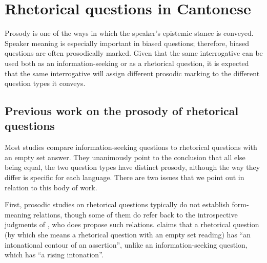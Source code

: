 \documentclass[output=paper,colorlinks,citecolor=brown            ,chinesefont]{langscibook}
\begin{document}
\section{Rhetorical questions in Cantonese}
\label{sec:Cantonese}
\largerpage
Prosody is one of the ways in which the speaker's epistemic stance is conveyed. Speaker meaning is especially important in biased questions; therefore, biased questions are often prosodically marked. Given that the same interrogative can be used both as an information-seeking or as a rhetorical question, it is expected that the same interrogative will assign different prosodic marking to the different question types it conveys.



\subsection{Previous work on the prosody of rhetorical questions}
\label{subsec:previous}

Most studies compare information-seeking questions to rhetorical questions wi\-th an empty set answer. They unanimously point to the conclusion that all else being equal, the two question types have distinct prosody, although the way they differ is specific for each language. There are two issues that we point out in relation to this body of work.

First, prosodic studies on rhetorical questions typically do not establish form-meaning relations, though some of them do refer back to the introspective judgments of \citet{Han2002}, who does propose such relations. \citet[215]{Han2002} claims that a rhetorical question (by which she means a rhetorical question with an empty set reading) has ``an intonational contour of an assertion'', unlike an in\-for\-ma\-tion-seeking question, which has ``a rising intonation''.
\end{document}
